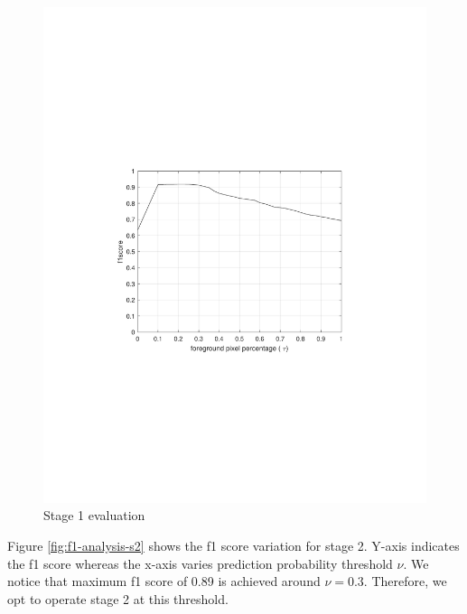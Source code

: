 \begin{figure}
    \centering
    \includegraphics[width=\linewidth,trim={100 240 100 250},clip]{images/f1-analysis-mog}
    \caption{Stage 1 evaluation}
    \label{fig:f1-analysis-mog}
\end{figure}

Figure \ref{fig:f1-analysis-s2} shows the f1 score variation for stage 2. Y-axis indicates the f1 score whereas the x-axis varies prediction probability threshold $\nu$. We notice that maximum f1 score of 0.89 is achieved around $\nu=0.3$. Therefore, we opt to operate stage 2 at this threshold.

